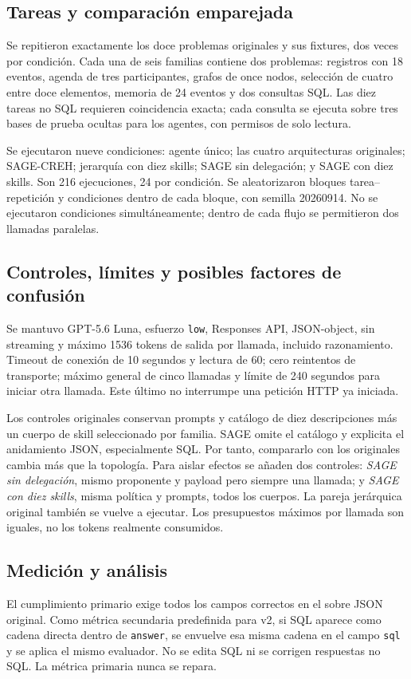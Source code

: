 \documentclass[11pt,a4paper]{article}
\begin{document}
\subsection{Tareas y comparación emparejada}
Se repitieron exactamente los doce problemas originales y sus fixtures, dos veces
por condición. Cada una de seis familias contiene dos problemas: registros con
18 eventos, agenda de tres participantes, grafos de once nodos, selección de cuatro
entre doce elementos, memoria de 24 eventos y dos consultas SQL. Las diez tareas
no SQL requieren coincidencia exacta; cada consulta se ejecuta sobre tres bases
de prueba ocultas para los agentes, con permisos de solo lectura.

Se ejecutaron nueve condiciones: agente único; las cuatro arquitecturas originales;
SAGE-CREH; jerarquía con diez skills; SAGE sin delegación; y SAGE con diez skills.
Son 216 ejecuciones, 24 por condición. Se aleatorizaron bloques tarea--repetición
y condiciones dentro de cada bloque, con semilla 20260914. No se ejecutaron
condiciones simultáneamente; dentro de cada flujo se permitieron dos llamadas paralelas.

\subsection{Controles, límites y posibles factores de confusión}
Se mantuvo GPT-5.6 Luna, esfuerzo \texttt{low}, Responses API, JSON-object, sin
streaming y máximo 1536 tokens de salida por llamada, incluido razonamiento.
Timeout de conexión de 10 segundos y lectura de 60; cero reintentos de transporte;
máximo general de cinco llamadas y límite de 240 segundos para iniciar otra
llamada. Este último no interrumpe una petición HTTP ya iniciada.

Los controles originales conservan prompts y catálogo de diez descripciones más
un cuerpo de skill seleccionado por familia. SAGE omite el catálogo y explicita
el anidamiento JSON, especialmente SQL. Por tanto, compararlo con los originales
cambia más que la topología. Para aislar efectos se añaden dos controles:
\textit{SAGE sin delegación}, mismo proponente y payload pero siempre una llamada;
y \textit{SAGE con diez skills}, misma política y prompts, todos los cuerpos.
La pareja jerárquica original también se vuelve a ejecutar. Los presupuestos
máximos por llamada son iguales, no los tokens realmente consumidos.

\subsection{Medición y análisis}
El cumplimiento primario exige todos los campos correctos en el sobre JSON
original. Como métrica secundaria predefinida para v2, si SQL aparece como cadena
directa dentro de \texttt{answer}, se envuelve esa misma cadena en el campo
\texttt{sql} y se aplica el mismo evaluador. No se edita SQL ni se corrigen
respuestas no SQL. La métrica primaria nunca se repara.
\end{document}
